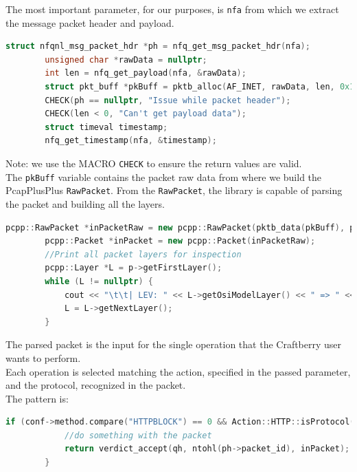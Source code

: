 \documentclass[12pt]{article}
\begin{document}
	The most important parameter, for our purposes, is \lstinline{nfa} from which we extract the message packet header and payload.\\
	\bigbreak

	\begin{lstlisting}[frame=single, language=C++]
		struct nfqnl_msg_packet_hdr *ph = nfq_get_msg_packet_hdr(nfa);
		unsigned char *rawData = nullptr;
		int len = nfq_get_payload(nfa, &rawData);
		struct pkt_buff *pkBuff = pktb_alloc(AF_INET, rawData, len, 0x1000);
		CHECK(ph == nullptr, "Issue while packet header");
		CHECK(len < 0, "Can't get payload data");
		struct timeval timestamp;
		nfq_get_timestamp(nfa, &timestamp);
	\end{lstlisting}

	Note: we use the MACRO \lstinline{CHECK} to ensure the return values are valid.\\
	\bigbreak
	The \lstinline{pkBuff} variable contains the packet raw data from where we build the PcapPlusPlus \lstinline{RawPacket}. From the \lstinline{RawPacket}, the library is capable of parsing the packet and building all the layers.\\
	\bigbreak

	\begin{lstlisting}[frame=single, language=C++]
		pcpp::RawPacket *inPacketRaw = new pcpp::RawPacket(pktb_data(pkBuff), pktb_len(pkBuff), timestamp, false, pcpp::LINKTYPE_RAW);
		pcpp::Packet *inPacket = new pcpp::Packet(inPacketRaw);
		//Print all packet layers for inspection
		pcpp::Layer *L = p->getFirstLayer();
		while (L != nullptr) {
			cout << "\t\t| LEV: " << L->getOsiModelLayer() << " => " << L->toString() << endl;
			L = L->getNextLayer();
		}
	\end{lstlisting}
	\bigbreak

	The parsed packet is the input for the single operation that the Craftberry user wants to perform.\\
	Each operation is selected matching the action, specified in the passed parameter, and the protocol, recognized in the packet.\\
	\bigbreak
	The pattern is: 
	\bigbreak

	\begin{lstlisting}[frame=single, language=C++]
		if (conf->method.compare("HTTPBLOCK") == 0 && Action::HTTP::isProtocol(inPacket)) {
			//do something with the packet
			return verdict_accept(qh, ntohl(ph->packet_id), inPacket);
		}
	\end{lstlisting}
	\bigbreak
\end{document}
